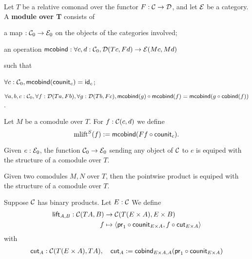 \documentclass{amsart}
\newcommand{\fat}[1]{\textbf{#1}}
\begin{document}
\begin{definition}
 Let $T$ be a relative comonad over the functor $F:\C\to\D$, and let $\E$ be a category.
 A \fat{module over T} consists of
   \begin{packitem}
   \item a map $:\C_0 \to \E_0$ on the objects of the categories involved;
   \item an operation $\mcobind: \forall c,d:\C_0, \D(Tc,Fd) \to \E(Mc,Md)$
  \end{packitem}
  such that 
  \begin{packitem}
   \item $\forall c : \C_0, \mcobind(\counit_c) = \id_c$;
   \item $\forall a,b,c:\C_0, \forall f : \D(Ta,Fb),\forall g:\D(Tb,Fc), \\
        \comp{\mcobind(f)}{\mcobind(g)} = \mcobind(\comp{\cobind(f)}{g})$ .
  \end{packitem}

\end{definition}


\begin{definition}
 Let $M$ be a comodule over $T$. For $f : \C(c,d)$ we define
  \[ \mlift^S(f) := \mcobind(\comp{\counit_c}{Ff}) .  \]
\end{definition}


\begin{definition}
  Given $e:\E_0$, the function $\C_0\to\E_0$ sending any object of $\C$ to $e$ is equiped with
  the structure of a comodule over $T$.
\end{definition}


\begin{definition}
 Given two comodules $M,N$ over $T$, then the pointwise product is equiped with the structure of 
 a comodule over $T$.
\end{definition}

\begin{definition}
 Suppose $\C$ has binary products. Let $E : \C$
 We define
 \begin{align*} \lift_{A,B} : \C(TA,B) &\to \C(T(E\times A),E\times B)\\
                                   f   &\mapsto \langle \comp{\counit_{E\times A}}{\pr_1}, \comp{\cut_{E\times A}}{f} \rangle
\end{align*}
with 
\begin{align*}
               \cut_A: \C(T(E\times A), TA), \quad \cut_A := \cobind_{E \times A, A}(\comp{\counit_{E \times A}}{\pr_1})
\end{align*}



\end{definition}
\end{document}

